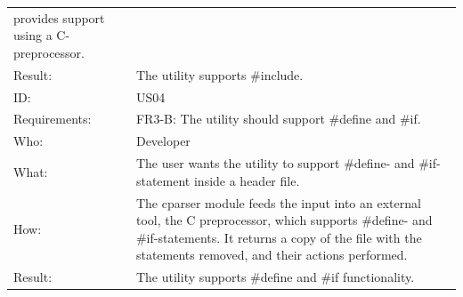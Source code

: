 \begin{table}[htbp]
{\begin{tabularx}{1.2\textwidth}{l X}
				 provides support using a C-preprocessor.  \\
	Result:		& The utility supports \#include. \\
	\midrule
	ID:			& US04 \\
	Requirements:	& FR3-B: The utility should support \#define and \#if. \\
	Who:			&  Developer\\
	What:		&  The user wants the utility to support \#define- and \#if-statement inside a header file.\\
	How:			& The cparser module feeds the input into an external tool, the C preprocessor, which supports 
				\#define- and \#if-statements. It returns a copy of the file with the statements removed, and their actions performed. \\
	Result:		& The utility supports \#define and \#if functionality. \\
	\bottomrule
\end{tabularx}}
\end{table}

